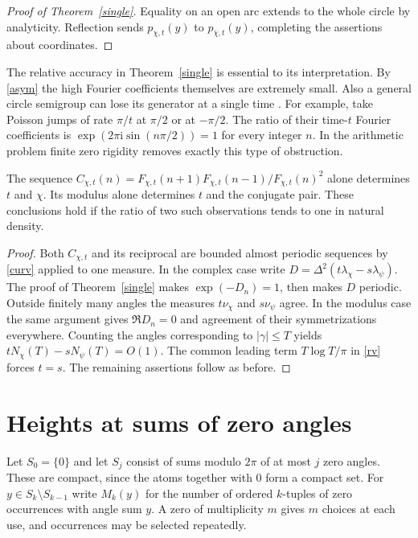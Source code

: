 \documentclass[11pt,letterpaper]{article}
\newcommand{\I}{\mathrm i}\newcommand{\e}{\mathrm e}
\theoremstyle{plain}
\theoremstyle{definition}\newtheorem{example}[theorem]{Example}
\begin{document}
\begin{proof}[Proof of Theorem~\ref{single}]
Equality on an open arc extends to the whole circle by analyticity. Reflection sends $p_{\chi,t}(y)$ to $p_{\bar\chi,t}(y)$, completing the assertions about coordinates.
\end{proof}

The relative accuracy in Theorem~\ref{single} is essential to its interpretation. By \eqref{asym} the high Fourier coefficients themselves are extremely small. Also a general circle semigroup can lose its generator at a single time \cite{hasebe}. For example, take Poisson jumps of rate $\pi/t$ at $\pi/2$ or at $-\pi/2$. The ratio of their time-$t$ Fourier coefficients is $\exp(2\pi\I\sin(n\pi/2))=1$ for every integer $n$. In the arithmetic problem finite zero rigidity removes exactly this type of obstruction.

\begin{corollary}\label{bounded}
The sequence $C_{\chi,t}(n)=F_{\chi,t}(n+1)F_{\chi,t}(n-1)/F_{\chi,t}(n)^2$ alone determines $t$ and $\chi$. Its modulus alone determines $t$ and the conjugate pair. These conclusions hold if the ratio of two such observations tends to one in natural density.
\end{corollary}
\begin{proof}
Both $C_{\chi,t}$ and its reciprocal are bounded almost periodic sequences by \eqref{curv} applied to one measure. In the complex case write $D=\Delta^2(t\lambda_\chi-s\lambda_\psi)$. The proof of Theorem~\ref{single} makes $\exp(-D_n)=1$, then makes $D$ periodic. Outside finitely many angles the measures $t\nu_\chi$ and $s\nu_\psi$ agree. In the modulus case the same argument gives $\Re D_n=0$ and agreement of their symmetrizations everywhere. Counting the angles corresponding to $|\gamma|\le T$ yields $tN_\chi(T)-sN_\psi(T)=O(1)$. The common leading term $T\log T/\pi$ in \eqref{rv} forces $t=s$. The remaining assertions follow as before.
\end{proof}

\section{Heights at sums of zero angles}\label{layers}
Let $S_0=\{0\}$ and let $S_j$ consist of sums modulo $2\pi$ of at most $j$ zero angles. These are compact, since the atoms together with $0$ form a compact set. For $y\in S_k\setminus S_{k-1}$ write $M_k(y)$ for the number of ordered $k$-tuples of zero occurrences with angle sum $y$. A zero of multiplicity $m$ gives $m$ choices at each use, and occurrences may be selected repeatedly.
\end{document}
